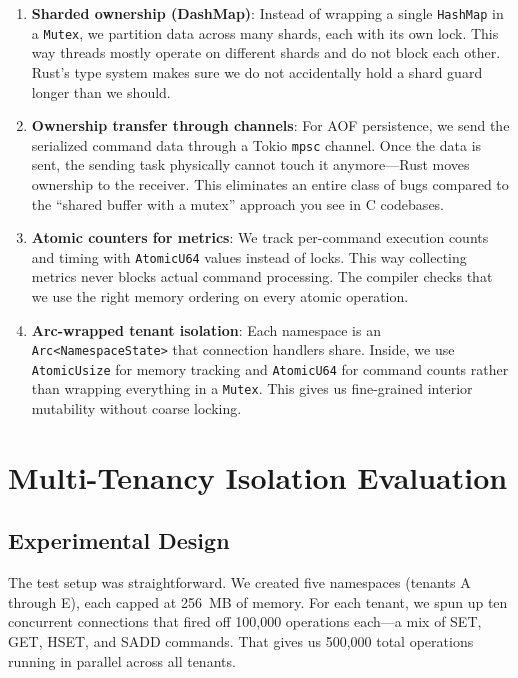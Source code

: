 \documentclass[conference,a4paper]{IEEEtran}
\begin{document}
\begin{enumerate}
    \item \textbf{Sharded ownership (DashMap)}: Instead of wrapping a single \texttt{HashMap} in a \texttt{Mutex}, we partition data across many shards, each with its own lock. This way threads mostly operate on different shards and do not block each other. Rust's type system makes sure we do not accidentally hold a shard guard longer than we should.

    \item \textbf{Ownership transfer through channels}: For AOF persistence, we send the serialized command data through a Tokio \texttt{mpsc} channel. Once the data is sent, the sending task physically cannot touch it anymore---Rust moves ownership to the receiver. This eliminates an entire class of bugs compared to the ``shared buffer with a mutex'' approach you see in C codebases.

    \item \textbf{Atomic counters for metrics}: We track per-command execution counts and timing with \texttt{AtomicU64} values instead of locks. This way collecting metrics never blocks actual command processing. The compiler checks that we use the right memory ordering on every atomic operation.

    \item \textbf{Arc-wrapped tenant isolation}: Each namespace is an \texttt{Arc\textless NamespaceState\textgreater} that connection handlers share. Inside, we use \texttt{AtomicUsize} for memory tracking and \texttt{AtomicU64} for command counts rather than wrapping everything in a \texttt{Mutex}. This gives us fine-grained interior mutability without coarse locking.
\end{enumerate}

\section{Multi-Tenancy Isolation Evaluation}

\subsection{Experimental Design}

The test setup was straightforward. We created five namespaces (tenants A through E), each capped at 256~MB of memory. For each tenant, we spun up ten concurrent connections that fired off 100,000 operations each---a mix of SET, GET, HSET, and SADD commands. That gives us 500,000 total operations running in parallel across all tenants.
\end{document}
